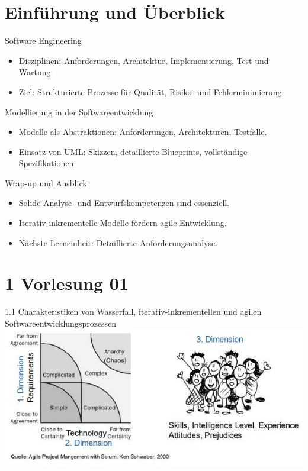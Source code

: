 \section{Einführung und Überblick}

\begin{definition}{Software Engineering}
\begin{itemize}
    \item Disziplinen: Anforderungen, Architektur, Implementierung, Test und Wartung.
    \item Ziel: Strukturierte Prozesse für Qualität, Risiko- und Fehlerminimierung.
\end{itemize}
\end{definition}

\begin{definition}{Modellierung in der Softwareentwicklung}
\begin{itemize}
    \item Modelle als Abstraktionen: Anforderungen, Architekturen, Testfälle.
    \item Einsatz von UML: Skizzen, detaillierte Blueprints, vollständige Spezifikationen.
    \end{itemize}
\end{definition}

\begin{definition}{Wrap-up und Ausblick}
\begin{itemize}
    \item Solide Analyse- und Entwurfskompetenzen sind essenziell.
    \item Iterativ-inkrementelle Modelle fördern agile Entwicklung.
    \item Nächste Lerneinheit: Detaillierte Anforderungsanalyse.
\end{itemize}
\end{definition}

\section*{1 Vorlesung 01}
1.1 Charakteristiken von Wasserfall, iterativ-inkrementellen und agilen Softwareentwicklungsprozessen\\
\includegraphics[width=\linewidth]{images/2024_12_29_0d1d7b5551ea1b4b41bdg-01}

